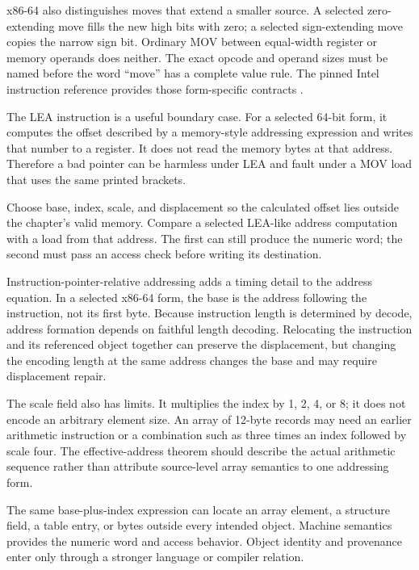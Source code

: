 x86-64 also distinguishes moves that extend a smaller source. A selected
zero-extending move fills the new high bits with zero; a selected sign-extending
move copies the narrow sign bit. Ordinary MOV between equal-width register or
memory operands does neither. The exact opcode and operand sizes must be named
before the word ``move'' has a complete value rule. The pinned Intel instruction
reference provides those form-specific contracts \autocite{intel2026sdm2}.

The LEA instruction is a useful boundary case. For a selected 64-bit form, it
computes the offset described by a memory-style addressing expression and
writes that number to a register. It does not read the memory bytes at that
address. Therefore a bad pointer can be harmless under LEA and fault under a
MOV load that uses the same printed brackets.

\begin{tryit}[title={Address calculation is not memory movement}]
Choose base, index, scale, and displacement so the calculated offset lies outside
the chapter's valid memory. Compare a selected LEA-like address computation
with a load from that address. The first can still produce the numeric word;
the second must pass an access check before writing its destination.
\end{tryit}

Instruction-pointer-relative addressing adds a timing detail to the address
equation. In a selected x86-64 form, the base is the address following the
instruction, not its first byte. Because instruction length is determined by
decode, address formation depends on faithful length decoding. Relocating the
instruction and its referenced object together can preserve the displacement,
but changing the encoding length at the same address changes the base and may
require displacement repair.

The scale field also has limits. It multiplies the index by 1, 2, 4, or 8; it
does not encode an arbitrary element size. An array of 12-byte records may
need an earlier arithmetic instruction or a combination such as three times an
index followed by scale four. The effective-address theorem should describe
the actual arithmetic sequence rather than attribute source-level array
semantics to one addressing form.

\begin{sidebar}[title={An address expression has no inherent object type}]
The same base-plus-index expression can locate an array element, a structure
field, a table entry, or bytes outside every intended object. Machine semantics
provides the numeric word and access behavior. Object identity and provenance
enter only through a stronger language or compiler relation.
\end{sidebar}

